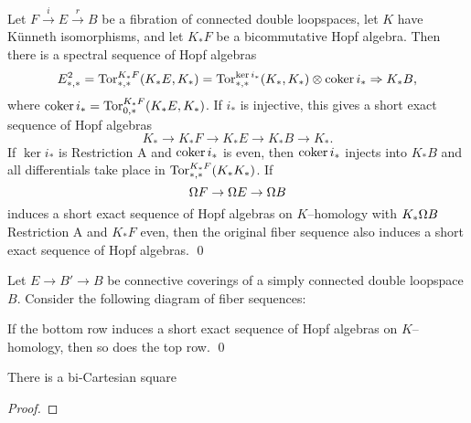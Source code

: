 \begin{theorem}
Let $F \xrightarrow i E \xrightarrow r B$ be a fibration of connected double loopspaces, let $K$ have K\"unneth isomorphisms, and let $K_* F$ be a bicommutative Hopf algebra.  Then there is a spectral sequence of Hopf algebras \[E^2_{*, *} = \operatorname{Tor}^{K_* F}_{*, *}(K_* E, K_*) = \operatorname{Tor}^{\ker i_*}_{*, *}(K_*, K_*) \otimes \operatorname{coker} i_* \Rightarrow K_* B,\] where $\operatorname{coker} i_* = \operatorname{Tor}^{K_* F}_{0, *}(K_* E, K_*)$.  If $i_*$ is injective, this gives a short exact sequence of Hopf algebras \[K_* \to K_* F \to K_* E \to K_* B \to K_*.\]  If $\ker i_*$ is Restriction A and $\operatorname{coker} i_*$ is even, then $\operatorname{coker} i_*$ injects into $K_* B$ and all differentials take place in $\operatorname{Tor}^{K_* F}_{*, *}(K_* K_*)$.  If \[\Omega F \to \Omega E \to \Omega B\] induces a short exact sequence of Hopf algebras on $K$--homology with $K_* \Omega B$ Restriction A and $K_* F$ even, then the original fiber sequence also induces a short exact sequence of Hopf algebras. \qed
\end{theorem}

\begin{corollary}
Let $E \to B' \to B$ be connective coverings of a simply connected double loopspace $B$.  Consider the following diagram of fiber sequences:
\begin{center}
\end{center}
If the bottom row induces a short exact sequence of Hopf algebras on $K$--homology, then so does the top row. \qed {}
\end{corollary}









\begin{theorem}
There is a bi-Cartesian square
\begin{center}
\end{center}
\end{theorem}
\begin{proof}
\end{proof}

